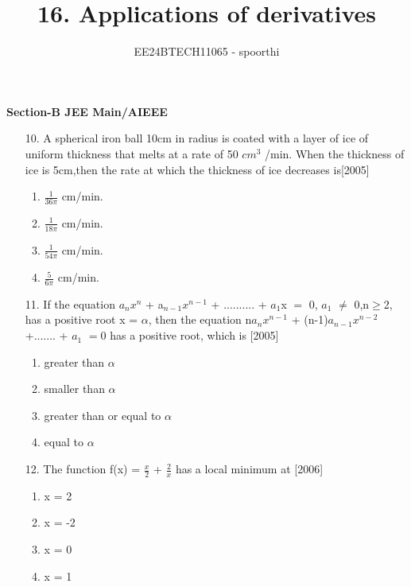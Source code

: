 \documentclass[journal,12pt,twocolumn]{IEEEtran}
\theoremstyle{remark}
\begin{document}



\title{16. Applications of derivatives}
\author{EE24BTECH11065 - spoorthi }
\maketitle
\newpage
\bigskip

\renewcommand{\thefigure}{\theenumi}
\renewcommand{\thetable}{\theenumi}
\begin{large}
\textbf{{Section-B JEE Main/AIEEE}}
\end{large}

\begin{enumerate}

    \item[10.] A spherical iron ball 10cm in radius is coated with a layer of ice of uniform thickness that melts at a rate of 50 $cm^3$ /min. When the thickness of ice is 5cm,then the rate at which the thickness of ice decreases is\hfill[2005]
    \begin{enumerate}
        \item 
        $\frac{1}{36\pi}$ cm/min.
        \item $\frac{1}{18\pi}$ cm/min.
        \item $\frac{1}{54\pi}$ cm/min.
        \item $\frac{5}{6\pi}$  cm/min.
    \end{enumerate}
    
    \item[11.] If the equation $a_nx^n$ + a$_{n-1}x^{n-1}$ + .......... + $a_1$x $=$ 0, $a_1$ $\ne$ 0,n$\geq$2, has a positive root x = $\alpha$, then the equation n$a_n$$x^{n-1}$ + (n-1)$a_{n-1}$$x^{n-2}$ +....... + $a_1$ $=$0 has a positive root, which is 
    \hfill[2005]
    \begin{enumerate}
        \item greater than $\alpha$
        \item smaller than $\alpha$
        \item greater than or equal to $\alpha$
        \item equal to $\alpha$
        \end{enumerate}\item[12.] The function f(x) = $\frac{x}{2}$ + $\frac{2}{x}$ has a local minimum at \hfill[2006]
        \begin{enumerate}
         \item x = 2
        \item x = -2
        \item x = 0
        \item x = 1
            

\end{enumerate}
\end{enumerate}
\end{document}
